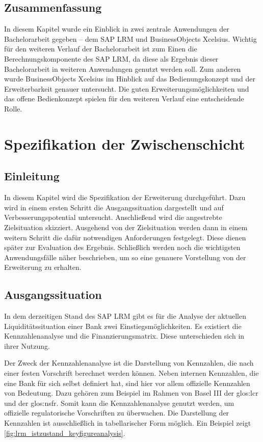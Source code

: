 \begin{onehalfspacing}
\section{Zusammenfassung}
In diesem Kapitel wurde ein Einblick in zwei zentrale Anwendungen der Bachelorarbeit gegeben -- dem SAP LRM und BusinessObjects Xcelsius. Wichtig für den weiteren Verlauf der Bachelorarbeit ist zum Einen die Berechnungskomponente des SAP LRM, da diese als Ergebnis dieser Bachelorarbeit in weiteren Anwendungen genutzt werden soll. Zum anderen wurde BusinessObjects Xcelsius im Hinblick auf das Bedienungskonzept und der Erweiterbarkeit genauer untersucht. Die guten Erweiterungsmöglichkeiten und das offene Bedienkonzept spielen für den weiteren Verlauf eine entscheidende Rolle.

\chapter{Spezifikation der Zwischenschicht}
\label{sec:spezifikation}

\section{Einleitung}
In diesem Kapitel wird die Spezifikation der Erweiterung durchgeführt. Dazu wird in einem ersten Schritt die Ausgangssituation dargestellt und auf Verbesserungspotential untersucht. Anschließend wird die angestrebte Zielsituation skizziert. Ausgehend von der Zielsituation werden dann in einem weitern Schritt die dafür notwendigen Anforderungen festgelegt. Diese dienen später zur Evaluation des Ergebnis. Schließlich werden noch die wichtigsten Anwendungsfälle näher beschrieben, um so eine genauere Vorstellung von der Erweiterung zu erhalten.

\section{Ausgangssituation}
In dem derzeitigen Stand des SAP LRM gibt es für die Analyse der aktuellen Liquiditätssituation einer Bank zwei Einstiegsmöglichkeiten. Es existiert die Kennzahlenanalyse und die Finanzierungsmatrix. Diese unterschieden sich in ihrer Nutzung.

Der Zweck der Kennzahlenanalyse ist die Darstellung von Kennzahlen, die nach einer festen Vorschrift berechnet werden können. Neben internen Kennzahlen, die eine Bank für sich selbst definiert hat, sind hier vor allem offizielle Kennzahlen von Bedeutung. Dazu gehören zum Beispiel im Rahmen von Basel III der \gls{glos:lcr} und der \gls{glos:nsfr}. Somit kann die Kennzahlenanalyse genutzt werden, um offizielle regulatorische Vorschriften zu überwachen. Die Darstellung der Kennzahlen ist ausschließlich in tabellarischer Form möglich. Ein Beispiel zeigt \vref{fig:lrm_istzustand_keyfigureanalysis}.


\end{onehalfspacing}
